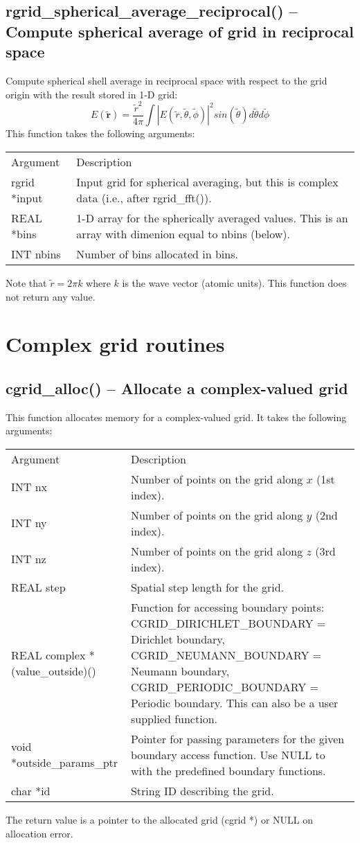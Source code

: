 \documentclass[12pt,letterpaper]{report}
\begin{document}
\subsection{rgrid\_spherical\_average\_reciprocal() -- Compute spherical average of grid in reciprocal space}

Compute spherical shell average in reciprocal space with respect to the grid origin with the result stored in 1-D grid:
$$E(\mathbf{\tilde{r}}) = \frac{\tilde{r}^2}{4\pi} \int |E(\tilde{r}, \tilde{\theta}, \tilde{\phi})|^2 sin(\tilde{\theta}) d\tilde{\theta} d\tilde{\phi}$$
This function takes the following arguments:
\begin{longtable}{p{} p{}}
Argument & Description\\
\cline{1-2}
rgrid *input & Input grid for spherical averaging, but this is complex data (i.e., after rgrid\_fft()).\\
REAL *bins & 1-D array for the spherically averaged values. This is an array with dimenion equal to nbins (below).\\
INT nbins & Number of bins allocated in bins.\\
\end{longtable}
\noindent
Note that $\tilde{r} = 2\pi k$ where $k$ is the wave vector (atomic units). This function does not return any value. 

\section{Complex grid routines}

\subsection{cgrid\_alloc() -- Allocate a complex-valued grid}

This function allocates memory for a complex-valued grid. It takes the following arguments:
\begin{longtable}{p{} p{}}
Argument & Description\\
\cline{1-2}
INT nx & Number of points on the grid along $x$ (1st index).\\
INT ny & Number of points on the grid along $y$ (2nd index).\\
INT nz & Number of points on the grid along $z$ (3rd index).\\
REAL step & Spatial step length for the grid.\\
REAL complex *(value\_outside)() & Function for accessing boundary points: CGRID\_DIRICHLET\_BOUNDARY = Dirichlet boundary, CGRID\_NEUMANN\_BOUNDARY = Neumann boundary, CGRID\_PERIODIC\_BOUNDARY  = Periodic boundary. This can also be a user supplied function.\\
void *outside\_params\_ptr & Pointer for passing parameters for the given boundary access function. Use NULL to with the predefined boundary functions.\\
char *id & String ID describing the grid.
\end{longtable}
\noindent
The return value is a pointer to the allocated grid (cgrid *) or NULL on allocation error.
\end{document}
